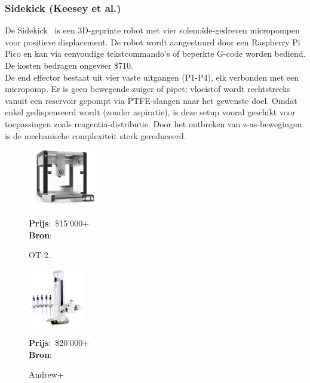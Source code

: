 \subsubsection{Sidekick (Keesey et al.)} 
De Sidekick\ \cite{RN41} is een 3D-geprinte robot met vier solenoïde-gedreven micropompen voor positieve displacement. De robot wordt aangestuurd door een Raspberry Pi Pico en kan via eenvoudige tekstcommando’s of beperkte G-code worden bediend. De kosten bedragen ongeveer \$710.\\[12pt]De end effector bestaat uit vier vaste uitgangen (P1-P4), elk verbonden met een micropomp. Er is geen bewegende zuiger of pipet; vloeistof wordt rechtstreeks vanuit een reservoir gepompt via PTFE-slangen naar het gewenste doel. Omdat enkel gedispenseerd wordt (zonder aspiratie), is deze setup vooral geschikt voor toepassingen zoals reagentia-distributie. Door het ontbreken van z-as-bewegingen is de mechanische complexiteit sterk gereduceerd.
\\[12pt]\begin{minipage}[t]{0.249\textwidth}
    \vspace{0pt}
    \begin{figure}[H]
        \centering
        \captionsetup{width=0.85\textwidth} %
        \includegraphics[height=2.5cm]{figures/opentronsot2.png}
        \caption{OT-2.}\label{fig:OT2}
        \textbf{Prijs}:\ \$15'000+\\
        \textbf{Bron}:\ \cite{RN27}
    \end{figure}
\end{minipage}
\begin{minipage}[t]{0.249\textwidth}
    \vspace{0pt}
    \begin{figure}[H]
        \centering
        \captionsetup{width=0.85\textwidth} %
        \includegraphics[height=2.5cm]{figures/Andrew-Alliance-liquid-handling-robot.png}
        \caption{Andrew+}\label{fig:Andrew}
        \textbf{Prijs}:\ \$20'000+\ \cite{RN43}\\
        \textbf{Bron}:\ \cite{RN28}
    \end{figure}
\end{minipage}
